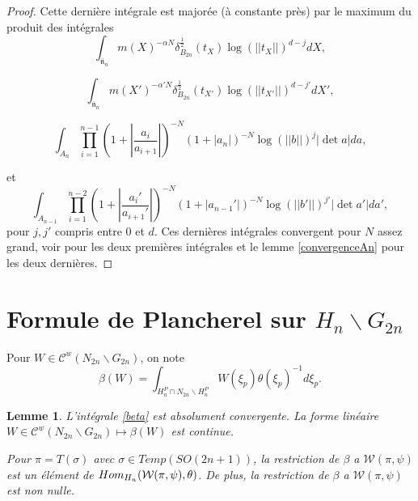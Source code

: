 \documentclass{amsart}
\newtheorem{lemme}{Lemme}[section]
\DeclareMathOperator{\Hom}{\mathnormal{Hom}}
\begin{document}
\begin{proof}
Cette dernière intégrale est majorée (à constante près) par le maximum du produit des intégrales
 \begin{equation}
 \int_{\bar{\mathfrak{n}}_n} m(X)^{-\alpha N} \delta^{\frac{1}{2}}_{B_{2n}}(t_X)\log(||t_X||)^{d-j} dX,
 \end{equation}
 
 \begin{equation}
 \int_{\bar{\mathfrak{n}}_n} m(X')^{-\alpha' N} \delta^{\frac{1}{2}}_{B_{2n}}(t_{X'})\log(||t_{X'}||)^{d-j'} dX',
 \end{equation}
 
 \begin{equation}
 \int_{A_n}  \prod_{i=1}^{n-1} (1+ |\frac{a_i}{a_{i+1}}|)^{-N} (1+|a_n|)^{-N}\log(||b||)^j|\det a| da,
 \end{equation}
 
 et
 \begin{equation}
 \int_{A_{n-1}}  \prod_{i=1}^{n-2} (1+ |\frac{a_i'}{a_{i+1}'}|)^{-N} (1+|a_{n-1}'|)^{-N}\log(||b'||)^{j'}|\det a'|da',
 \end{equation}
 pour $j, j'$ compris entre $0$ et $d$. Ces dernières intégrales convergent pour $N$ assez grand, voir \cite[proposition 5.5]{jacquet-shalika} pour les deux premières intégrales et le lemme \ref{convergenceAn} pour les deux dernières.

 \end{proof}
 
 
 \section{Formule de Plancherel sur $H_n \backslash G_{2n}$}
 
 Pour $W \in \mathcal{C}^w(N_{2n} \backslash G_{2n})$, on note
\begin{equation}
\label{beta}
\beta(W) = \int_{H^P_n \cap N_{2n} \backslash H^P_n} W(\xi_p) \theta(\xi_p)^{-1} d\xi_p.
\end{equation}

\begin{lemme}
\label{lemmebeta}
L'intégrale \ref{beta} est absolument convergente. La forme linéaire $W \in \mathcal{C}^w(N_{2n} \backslash G_{2n}) \mapsto \beta(W)$ est continue.

Pour $\pi = T(\sigma)$ avec $\sigma \in Temp(SO(2n+1))$, la restriction de $\beta$ a $\mathcal{W}(\pi, \psi)$ est un élément de $\Hom_{H_n}(\mathcal{W}(\pi, \psi), \theta)$. De plus, la restriction de $\beta$ a $\mathcal{W}(\pi, \psi)$ est non nulle.
\end{lemme}
\end{document}
